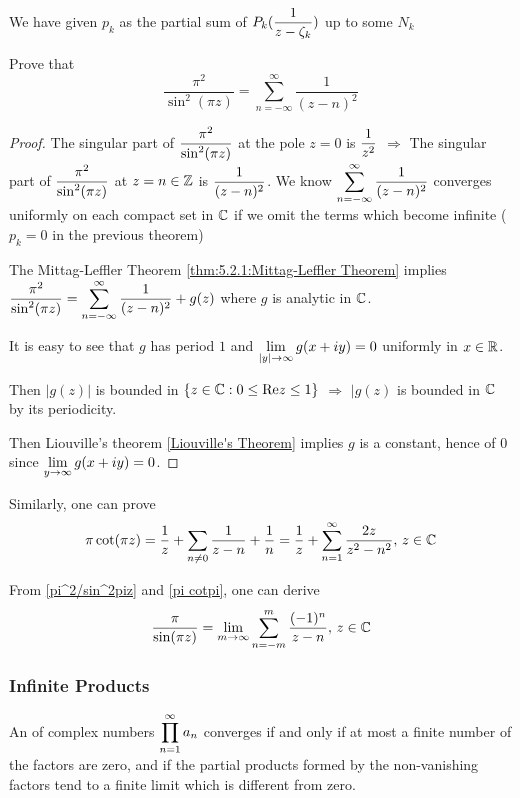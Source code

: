 \begin{remark}
    We have given  $ p_k $ as the partial sum of  $ \displaystyle P_k(\frac{1}{z-\zeta_k}) $ up to some  $ N_k $   
\end{remark}
\begin{example}
    Prove that 
    \begin{equation}\label{pi^2/sin^2piz}
        \frac{\pi^2}{\sin^2(\pi z)}=\sum_{n=-\infty}^\infty\frac{1}{(z-n)^2}    
    \end{equation}
\end{example}
\begin{proof}
    The singular part of  $ \displaystyle\frac{\pi^2}{\sin^2(\pi z)} $ at the pole  $ z=0 $ is  $ \displaystyle\frac{1}{z^2} $ $ \Rightarrow  $ The singular part
    of  $ \displaystyle\frac{\pi^2}{\sin^2(\pi z)} $    at  $ z=n\in\mathbb Z $ is  $ \displaystyle\frac{1}{(z-n)^2}$. We know  $ \displaystyle\sum_{n=-\infty}^\infty\frac{1}{(z-n)^2} $
    converges uniformly on each compact set in  $ \mathbb C  $ if we omit the terms which become infinite (\ie  $ p_k =0 $ in the previous theorem)
    
    The Mittag-Leffler Theorem \ref{thm:5.2.1:Mittag-Leffler Theorem} implies  $ \displaystyle\frac{\pi^2}{\sin^2(\pi z)}=\displaystyle\sum_{n=-\infty}^\infty \frac{1}{(z-n)^2}+g(z) $ 
    where  $ g  $ is analytic in  $ \mathbb C $.
    
    It is easy to see that  $  g  $ has period  $ 1  $ and  $ \displaystyle\lim_{|y|\to\infty}g(x+iy)=0 $ uniformly in  $ x\in \mathbb R $.
    
    Then  $ |g(z)| $ is bounded in  $ \{z\in \mathbb C:0 \leq \mathrm{Re} z \leq 1\} $ $ \Rightarrow  $  $ |g(z) $ is bounded in  $ \mathbb C $ by its periodicity.
    
    Then Liouville's theorem \ref{Liouville's Theorem} implies  $ g  $ is a constant, hence of  $ 0  $ since  $ \displaystyle\lim_{y\to\infty}g(x+iy)=0 $. 
\end{proof}
Similarly, one can prove 
\begin{equation}\label{pi cotpi}
    \pi\cot(\pi z)=\frac{1}{z}+\sum_{n\neq 0}\frac{1}{z-n}+\frac{1}{n}=\frac{1}{z}+\sum_{n=1}^\infty\frac{2z}{z^2-n^2},\,z\in \mathbb C
\end{equation}

From  \eqref{pi^2/sin^2piz} and \eqref{pi cotpi}, one can derive 
\begin{equation}
    \frac{\pi}{\sin(\pi z)}=\lim_{m\to\infty}\sum_{n=-m}^m\frac{(-1)^n}{z-n},\,z\in\mathbb C
\end{equation}
\subsubsection{Infinite Products}
An  of complex numbers  $ \displaystyle\prod_{n=1}^\infty a_n $ converges if and only if at most a finite number of the factors are zero,
and if the partial products formed by the non-vanishing factors tend to a finite limit which is different from zero. 

